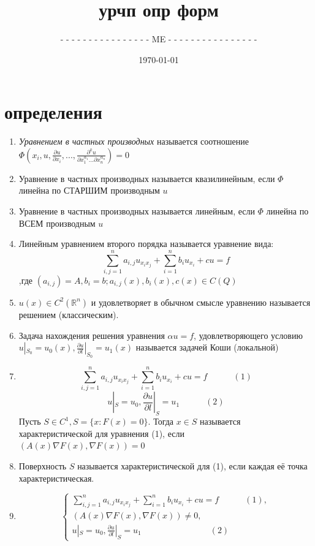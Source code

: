 \documentclass[a4paper,12pt]{article}
\newcommand {\pp} {\partial}
\newcommand {\AL} {\alpha}
\newcommand {\LS} {\sum\limits}
\begin{document}
\large
\author{- - - - - - - - - - - - - - - - ME - - - - - - - - - - - - - - - -}
\title{урчп опр форм}
\date{\today}
\maketitle


\newpage


\tableofcontents
\newpage

\section{определения}
\begin{enumerate}
\item \textit{Уравнением в частных производных} называется соотношение \\$\Phi(x_i, u, \frac{\pp u}{\pp x_i}, ..., \frac{\pp^k u}{\pp x_1^{\AL_1}...\pp x_n^{\AL_n}}) = 0$
\item Уравнение в частных производных называется квазилинейным, если $\Phi$ линейна по СТАРШИМ производным $u$
\item Уравнение в частных производных называется линейным, если $\Phi$ линейна по ВСЕМ производным $u$
\item Линейным уравнением второго порядка называется уравнение вида:
$$\LS_{i,j = 1}^n a_{i,j} u_{x_i x_j} + \LS_{i=1}^n b_i u_{x_i} +cu = f$$,где $(a_{i,j}) = A, b_i = b; a_{i,j}(x), b_i(x), c(x) \in C(Q)$
\item $u(x)\in C^2(\mathbb{R}^n)$ и удовлетворяет в обычном смысле уравнению называется решением (классическим).
\item Задача нахождения решения уравнения $\AL u = f$, удовлетворяющего условию $u|_{S_0} = u_0(x), \frac{\pp u}{\pp l}|_{S_0} = u_1(x)$ называется задачей Коши (локальной)
\item 
$$\LS_{i,j = 1}^n a_{i,j} u_{x_i x_j} + \LS_{i=1}^n b_i u_{x_i} +cu = f \quad\quad\quad(1)$$
$$u|_S=u_0, \frac{\pp u}{\pp l}|_S = u_1 \quad\quad\quad(2)$$
Пусть $S\in C^1, S = \{x: F(x) = 0\}$. Тогда $x \in S$ называется характеристической для уравнения (1), если $(A(x)\nabla F(x), \nabla F(x)) = 0$
\item Поверхность $S$ называется характеристической для (1), если каждая её точка характеристическая.

\item 

\begin{equation*}
 \begin{cases}
   \LS_{i,j = 1}^n a_{i,j} u_{x_i x_j} + \LS_{i=1}^n b_i u_{x_i} +cu = f \quad\quad\quad(1),
   \\
	(A(x)\nabla F(x), \nabla F(x)) \ne 0,
	\\
	u|_S=u_0, \frac{\pp u}{\pp l}|_S = u_1 \quad\quad\quad\quad\quad\quad\quad\quad(2)
 \end{cases}
\end{equation*}


\end{enumerate}
\end{document}
